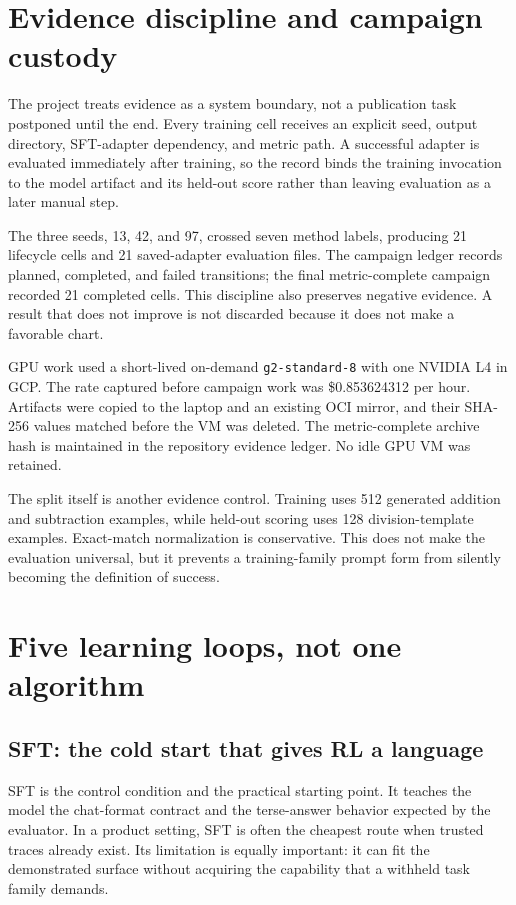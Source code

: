 \documentclass[10pt]{article}
\begin{document}
\section{Evidence discipline and campaign custody}\label{sec:evidence}
The project treats evidence as a system boundary, not a publication task postponed until the end. Every training cell receives an explicit seed, output directory, SFT-adapter dependency, and metric path. A successful adapter is evaluated immediately after training, so the record binds the training invocation to the model artifact and its held-out score rather than leaving evaluation as a later manual step.

The three seeds, 13, 42, and 97, crossed seven method labels, producing 21 lifecycle cells and 21 saved-adapter evaluation files. The campaign ledger records planned, completed, and failed transitions; the final metric-complete campaign recorded 21 completed cells. This discipline also preserves negative evidence. A result that does not improve is not discarded because it does not make a favorable chart.

GPU work used a short-lived on-demand \texttt{g2-standard-8} with one NVIDIA L4 in GCP. The rate captured before campaign work was \$0.853624312 per hour. Artifacts were copied to the laptop and an existing OCI mirror, and their SHA-256 values matched before the VM was deleted. The metric-complete archive hash is maintained in the repository evidence ledger. No idle GPU VM was retained.

The split itself is another evidence control. Training uses 512 generated addition and subtraction examples, while held-out scoring uses 128 division-template examples. Exact-match normalization is conservative. This does not make the evaluation universal, but it prevents a training-family prompt form from silently becoming the definition of success.

\section{Five learning loops, not one algorithm}
\subsection{SFT: the cold start that gives RL a language}
SFT is the control condition and the practical starting point. It teaches the model the chat-format contract and the terse-answer behavior expected by the evaluator. In a product setting, SFT is often the cheapest route when trusted traces already exist. Its limitation is equally important: it can fit the demonstrated surface without acquiring the capability that a withheld task family demands.
\end{document}
